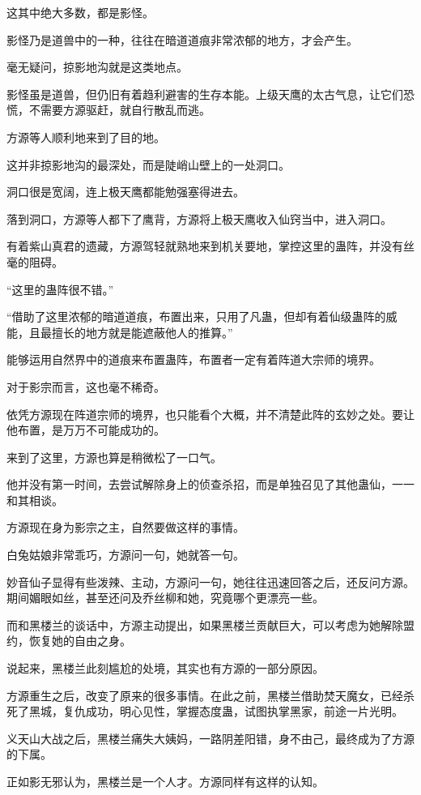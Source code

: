 \begin{this_body}
这其中绝大多数，都是影怪。

影怪乃是道兽中的一种，往往在暗道道痕非常浓郁的地方，才会产生。

毫无疑问，掠影地沟就是这类地点。

影怪虽是道兽，但仍旧有着趋利避害的生存本能。上级天鹰的太古气息，让它们恐慌，不需要方源驱赶，就自行散乱而逃。

方源等人顺利地来到了目的地。

这并非掠影地沟的最深处，而是陡峭山壁上的一处洞口。

洞口很是宽阔，连上极天鹰都能勉强塞得进去。

落到洞口，方源等人都下了鹰背，方源将上极天鹰收入仙窍当中，进入洞口。

有着紫山真君的遗藏，方源驾轻就熟地来到机关要地，掌控这里的蛊阵，并没有丝毫的阻碍。

“这里的蛊阵很不错。”

“借助了这里浓郁的暗道道痕，布置出来，只用了凡蛊，但却有着仙级蛊阵的威能，且最擅长的地方就是能遮蔽他人的推算。”

能够运用自然界中的道痕来布置蛊阵，布置者一定有着阵道大宗师的境界。

对于影宗而言，这也毫不稀奇。

依凭方源现在阵道宗师的境界，也只能看个大概，并不清楚此阵的玄妙之处。要让他布置，是万万不可能成功的。

来到了这里，方源也算是稍微松了一口气。

他并没有第一时间，去尝试解除身上的侦查杀招，而是单独召见了其他蛊仙，一一和其相谈。

方源现在身为影宗之主，自然要做这样的事情。

白兔姑娘非常乖巧，方源问一句，她就答一句。

妙音仙子显得有些泼辣、主动，方源问一句，她往往迅速回答之后，还反问方源。期间媚眼如丝，甚至还问及乔丝柳和她，究竟哪个更漂亮一些。

而和黑楼兰的谈话中，方源主动提出，如果黑楼兰贡献巨大，可以考虑为她解除盟约，恢复她的自由之身。

说起来，黑楼兰此刻尴尬的处境，其实也有方源的一部分原因。

方源重生之后，改变了原来的很多事情。在此之前，黑楼兰借助焚天魔女，已经杀死了黑城，复仇成功，明心见性，掌握态度蛊，试图执掌黑家，前途一片光明。

义天山大战之后，黑楼兰痛失大姨妈，一路阴差阳错，身不由己，最终成为了方源的下属。

正如影无邪认为，黑楼兰是一个人才。方源同样有这样的认知。


\end{this_body}
